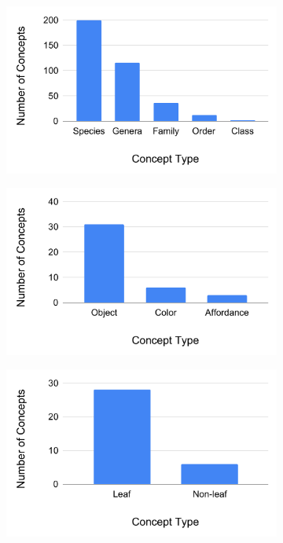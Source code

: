 \begin{figure}[h]
  \centering
\begin{subfigure}{0.28\textwidth}
\includegraphics[width=\textwidth]{figures/chart_CUB.pdf}
\end{subfigure}
\hspace{0.01\textwidth}
\begin{subfigure}{0.28\textwidth}
\includegraphics[width=\textwidth]{figures/chart_House.pdf}
\end{subfigure}
\hspace{0.01\textwidth}
%
\begin{subfigure}{0.28\textwidth}
\includegraphics[width=\textwidth]{figures/chart_Zoo.pdf}
\end{subfigure}



\end{figure}
